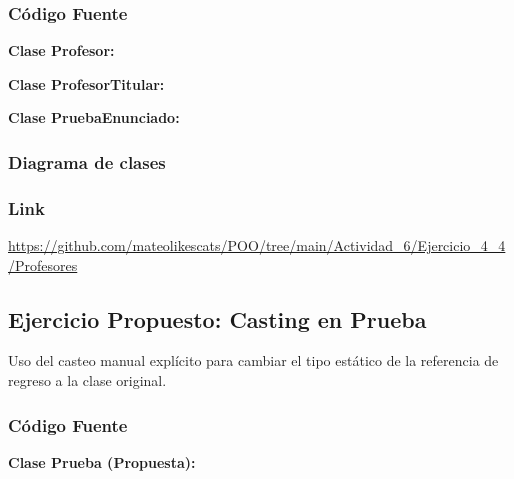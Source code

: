 \documentclass[a4paper]{article} %
\newcommand{\umlclass}[7]{%
  \node[inner sep=0pt, outer sep=0pt, drop shadow={opacity=0.25, shadow xshift=2pt, shadow yshift=-2pt}] (#1) at #2 {%
    \scriptsize\sffamily
    \renewcommand{\arraystretch}{1.10}%
    \setlength{\tabcolsep}{4pt}%
    \begin{tabular}{|L{#3}|}
      \hline
      \rowcolor{#4}\multicolumn{1}{|c|}{\bfseries #5}\\
      \hline
      #6\\
      \hline
      #7\\
      \hline
    \end{tabular}%
  };%
}
\begin{document}
\subsubsection{Código Fuente}
\textbf{Clase Profesor:}


\textbf{Clase ProfesorTitular:}


\textbf{Clase PruebaEnunciado:}


\subsubsection{Diagrama de clases}
\begin{center}
\end{center}

\subsubsection{Link}
\url{https://github.com/mateolikescats/POO/tree/main/Actividad_6/Ejercicio_4_4/Profesores}

\subsection{Ejercicio Propuesto: Casting en Prueba}
Uso del casteo manual explícito para cambiar el tipo estático de la referencia de regreso a la clase original.

\subsubsection{Código Fuente}
\textbf{Clase Prueba (Propuesta):}

\end{document}
